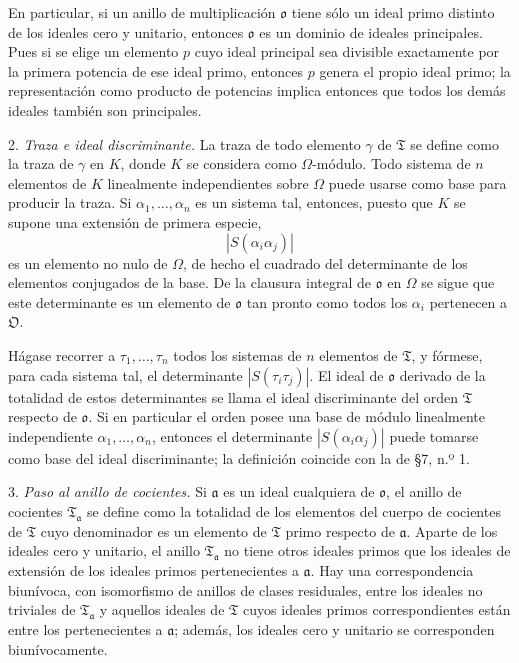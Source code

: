 \documentclass[11pt]{article}
\providecommand{\mT}{\mathfrak{T}}
\providecommand{\mO}{\mathfrak{O}}
\providecommand{\mo}{\mathfrak{o}}
\providecommand{\ma}{\mathfrak{a}}
\begin{document}
En particular, si un anillo de multiplicación $\mo$ tiene sólo un ideal primo distinto de los ideales cero y unitario, entonces $\mo$ es un dominio de ideales principales. Pues si se elige un elemento $p$ cuyo ideal principal sea divisible exactamente por la primera potencia de ese ideal primo, entonces $p$ genera el propio ideal primo; la representación como producto de potencias implica entonces que todos los demás ideales también son principales.

2. \emph{Traza e ideal discriminante.} La traza de todo elemento $\gamma$ de $\mT$ se define como la traza de $\gamma$ en $K$, donde $K$ se considera como $\Omega$-módulo. Todo sistema de $n$ elementos de $K$ linealmente independientes sobre $\Omega$ puede usarse como base para producir la traza. Si $\alpha_1,\ldots,\alpha_n$ es un sistema tal, entonces, puesto que $K$ se supone una extensión de primera especie,
\[
        |S(\alpha_i\alpha_j)|
\]
es un elemento no nulo de $\Omega$, de hecho el cuadrado del determinante de los elementos conjugados de la base. De la clausura integral de $\mo$ en $\Omega$ se sigue que este determinante es un elemento de $\mo$ tan pronto como todos los $\alpha_i$ pertenecen a $\mO$.

Hágase recorrer a $\tau_1,\ldots,\tau_n$ todos los sistemas de $n$ elementos de $\mT$, y fórmese, para cada sistema tal, el determinante $|S(\tau_i\tau_j)|$. El ideal de $\mo$ derivado de la totalidad de estos determinantes se llama el ideal discriminante del orden $\mT$ respecto de $\mo$. Si en particular el orden posee una base de módulo linealmente independiente $\alpha_1,\ldots,\alpha_n$, entonces el determinante $|S(\alpha_i\alpha_j)|$ puede tomarse como base del ideal discriminante; la definición coincide con la de \S 7, n.º 1.

3. \emph{Paso al anillo de cocientes.} Si $\ma$ es un ideal cualquiera de $\mo$, el anillo de cocientes $\mT_\ma$ se define como la totalidad de los elementos del cuerpo de cocientes de $\mT$ cuyo denominador es un elemento de $\mT$ primo respecto de $\ma$. Aparte de los ideales cero y unitario, el anillo $\mT_\ma$ no tiene otros ideales primos que los ideales de extensión de los ideales primos pertenecientes a $\ma$. Hay una correspondencia biunívoca, con isomorfismo de anillos de clases residuales, entre los ideales no triviales de $\mT_\ma$ y aquellos ideales de $\mT$ cuyos ideales primos correspondientes están entre los pertenecientes a $\ma$; además, los ideales cero y unitario se corresponden biunívocamente.
\end{document}
